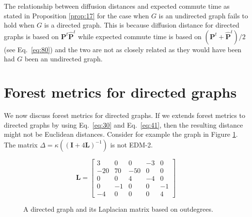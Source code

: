 The relationship between diffusion distances and expected commute time
as stated in Proposition \ref{prop:17} for the case when $G$ is an
undirected graph fails to hold when $G$ is a directed graph. This is
because diffusion distance for directed graphs is based on
$\mathbf{P}^{t}\hat{\mathbf{P}}^{t}$ while expected commute time is
based on $(\mathbf{P}^{t} + \hat{\mathbf{P}}^{t})/2$ (see
Eq.~\eqref{eq:80}) and the two are not as closely related as they
would have been had $G$ been an undirected graph. 
\section{Forest metrics for directed graphs}
\label{sec:forest-metr-direct}
We now discuss forest metrics
\citep{chebotarev02:_fores_metric_for_graph_vertic} for directed
graphs. If we extends forest metrics to directed graphs by using
Eq.~\eqref{eq:30} and Eq.~\eqref{eq:41}, then the resulting distance
might not be Euclidean distances. Consider for example the graph in
Figure \ref{fig:directed_graph1}. The matrix $\Delta =
\kappa((\mathbf{I} + 4 \mathbf{L})^{-1})$ is not EDM-2.
\begin{figure}[hbtp]
  \centering
  \begin{minipage}[c]{0.45\textwidth}
    \centering
  \end{minipage}
  \begin{minipage}[c]{0.38\textwidth}
    \begin{equation*}
      \mathbf{L} = \left[ \begin{array}{rrrrr}
          3  & 0  & 0 & -3  & 0 \\
          -20 & 70 & -50 & 0   & 0 \\
          0  & 0  & 4  & -4 & 0 \\
          0  & -1 & 0 & 0 & -1 \\
          -4 &  0 & 0 & 0  & 4
        \end{array} \right ]
    \end{equation*}
    \caption{A directed graph and its Laplacian matrix based on outdegrees.}
    \label{fig:directed_graph1}
  \end{minipage}
\end{figure}
